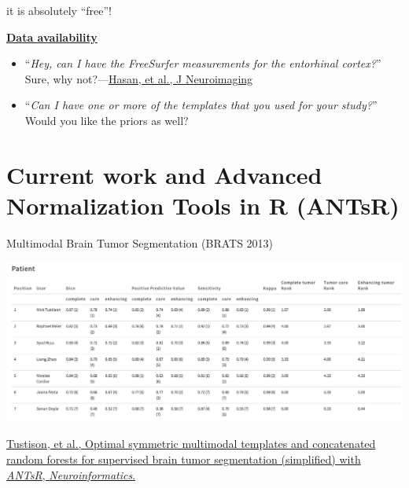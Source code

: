 \documentclass[ignorenonframetext,]{beamer}
\newenvironment{Shaded}{\begin{snugshade}}{\end{snugshade}}
\newcommand{\KeywordTok}[1]{\textcolor[rgb]{0.13,0.29,0.53}{\textbf{{#1}}}}
\newcommand{\OtherTok}[1]{\textcolor[rgb]{0.56,0.35,0.01}{{#1}}}
\newcommand{\NormalTok}[1]{{#1}}
\begin{document}
\begin{frame}[fragile]{it is absolutely ``free''!}

\begin{Shaded}
\end{Shaded}

\end{frame}

\begin{frame}

\href{https://github.com/ntustison/KapowskiChronicles}{\textbf{Data
availability}}

\begin{itemize}
\item
  ``\emph{Hey, can I have the FreeSurfer measurements for the entorhinal
  cortex?}'' Sure, why
  not?---\href{http://www.ncbi.nlm.nih.gov/pubmed/26565394}{Hasan, et
  al., J Neuroimaging}
\item
  ``\emph{Can I have one or more of the templates that you used for your
  study?}'' Would you like the priors as well?
\end{itemize}

\end{frame}

\section{Current work and Advanced Normalization Tools in R
(ANTsR)}\label{current-work-and-advanced-normalization-tools-in-r-antsr}

\begin{frame}{Multimodal Brain Tumor Segmentation (BRATS 2013)}

\includegraphics{./competitions/figures/brats2013results2.png}

\href{http://www.ncbi.nlm.nih.gov/pubmed/25433513}{Tustison, et al.,
Optimal symmetric multimodal templates and concatenated random forests
for supervised brain tumor segmentation (simplified) with \emph{ANTsR},
\emph{Neuroinformatics}.}

\end{frame}
\end{document}
